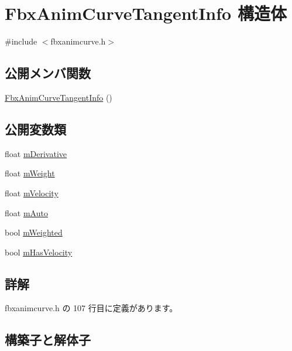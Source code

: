 \hypertarget{struct_fbx_anim_curve_tangent_info}{}\section{Fbx\+Anim\+Curve\+Tangent\+Info 構造体}
\label{struct_fbx_anim_curve_tangent_info}


{\ttfamily \#include $<$fbxanimcurve.\+h$>$}

\subsection*{公開メンバ関数}
\begin{DoxyCompactItemize}
\item 
\hyperlink{struct_fbx_anim_curve_tangent_info_a2303015d59098b2cb51e0619da55e463}{Fbx\+Anim\+Curve\+Tangent\+Info} ()
\end{DoxyCompactItemize}
\subsection*{公開変数類}
\begin{DoxyCompactItemize}
\item 
float \hyperlink{struct_fbx_anim_curve_tangent_info_abd0ff621b7ca5bb0edf54f62dadfed25}{m\+Derivative}
\item 
float \hyperlink{struct_fbx_anim_curve_tangent_info_a8cf904d34d913370ea3344b1857532a8}{m\+Weight}
\item 
float \hyperlink{struct_fbx_anim_curve_tangent_info_a12c39deedc5bde4e64a41a606a9bac89}{m\+Velocity}
\item 
float \hyperlink{struct_fbx_anim_curve_tangent_info_a24d7f2c4210a679ddc3e5e846282c47c}{m\+Auto}
\item 
bool \hyperlink{struct_fbx_anim_curve_tangent_info_ae608f70fa456fbe2ce25ba65580c2db0}{m\+Weighted}
\item 
bool \hyperlink{struct_fbx_anim_curve_tangent_info_ad61ef6060ebd2468e06dfdbd32295a29}{m\+Has\+Velocity}
\end{DoxyCompactItemize}


\subsection{詳解}


 fbxanimcurve.\+h の 107 行目に定義があります。



\subsection{構築子と解体子}
\mbox{\label{struct_fbx_anim_curve_tangent_info_a2303015d59098b2cb51e0619da55e463}} 
